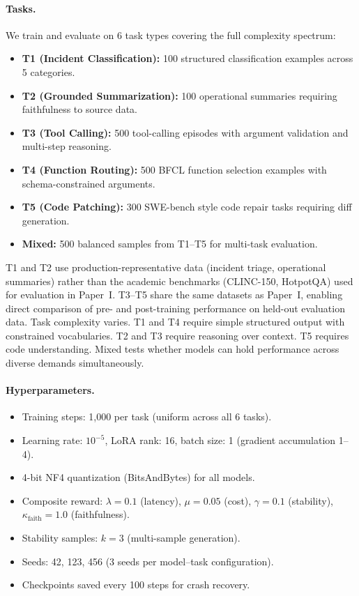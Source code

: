 \documentclass[11pt]{article}
\begin{document}
\paragraph{Tasks.}
We train and evaluate on 6 task types covering the full complexity spectrum:
\begin{itemize}[leftmargin=12pt]
    \item \textbf{T1 (Incident Classification):} 100 structured classification examples across 5 categories.
    \item \textbf{T2 (Grounded Summarization):} 100 operational summaries requiring faithfulness to source data.
    \item \textbf{T3 (Tool Calling):} 500 tool-calling episodes with argument validation and multi-step reasoning.
    \item \textbf{T4 (Function Routing):} 500 BFCL function selection examples with schema-constrained arguments.
    \item \textbf{T5 (Code Patching):} 300 SWE-bench style code repair tasks requiring diff generation.
    \item \textbf{Mixed:} 500 balanced samples from T1--T5 for multi-task evaluation.
\end{itemize}
T1 and T2 use production-representative data (incident triage, operational summaries) rather than the academic benchmarks (CLINC-150, HotpotQA) used for evaluation in Paper~I.  T3--T5 share the same datasets as Paper~I, enabling direct comparison of pre- and post-training performance on held-out evaluation data.  Task complexity varies.  T1 and T4 require simple structured output with constrained vocabularies.  T2 and T3 require reasoning over context.  T5 requires code understanding.  Mixed tests whether models can hold performance across diverse demands simultaneously.

\paragraph{Hyperparameters.}
\begin{itemize}[leftmargin=12pt]
    \item Training steps: 1{,}000 per task (uniform across all 6 tasks).
    \item Learning rate: $10^{-5}$, LoRA rank: 16, batch size: 1 (gradient accumulation 1--4).
    \item 4-bit NF4 quantization (BitsAndBytes) for all models.
    \item Composite reward: $\lambda = 0.1$ (latency), $\mu = 0.05$ (cost), $\gamma = 0.1$ (stability), $\kappa_{\text{faith}} = 1.0$ (faithfulness).
    \item Stability samples: $k=3$ (multi-sample generation).
    \item Seeds: 42, 123, 456 (3 seeds per model--task configuration).
    \item Checkpoints saved every 100 steps for crash recovery.
\end{itemize}
\end{document}
